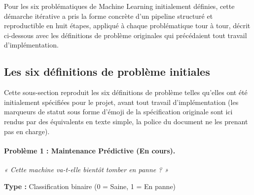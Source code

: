 Pour les six problématiques de Machine Learning initialement définies, cette démarche itérative a pris la forme concrète d'un pipeline structuré et reproductible en huit étapes, appliqué à chaque problématique tour à tour, décrit ci-dessous avec les définitions de problème originales qui précédaient tout travail d'implémentation.

\subsection{Les six définitions de problème initiales}

Cette sous-section reproduit les six définitions de problème telles qu'elles ont été initialement spécifiées pour le projet, avant tout travail d'implémentation (les marqueurs de statut sous forme d'émoji de la spécification originale sont ici rendus par des équivalents en texte simple, la police du document ne les prenant pas en charge).

\paragraph{Problème 1 : Maintenance Prédictive (En cours).}
\emph{« Cette machine va-t-elle bientôt tomber en panne ? »}

\textbf{Type :} Classification binaire (0 = Saine, 1 = En panne)

